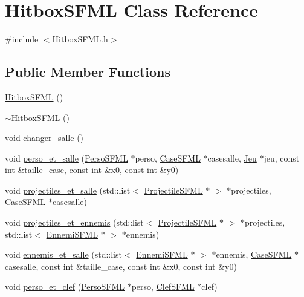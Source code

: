 \hypertarget{classHitboxSFML}{}\section{Hitbox\+S\+F\+ML Class Reference}
\label{classHitboxSFML}


{\ttfamily \#include $<$Hitbox\+S\+F\+M\+L.\+h$>$}

\subsection*{Public Member Functions}
\begin{DoxyCompactItemize}
\item 
\hyperlink{classHitboxSFML_aafccc1508ac80fe745810f2d9f4c10b1}{Hitbox\+S\+F\+ML} ()
\item 
\hyperlink{classHitboxSFML_a7db8de961747c56a000ccd1eb092805d}{$\sim$\+Hitbox\+S\+F\+ML} ()
\item 
void \hyperlink{classHitboxSFML_a8eed6ede26a0f46267570d7e8d96c199}{changer\+\_\+salle} ()
\item 
void \hyperlink{classHitboxSFML_a8ee11312dc168d63978e355af4c56af5}{perso\+\_\+et\+\_\+salle} (\hyperlink{classPersoSFML}{Perso\+S\+F\+ML} $\ast$perso, \hyperlink{classCaseSFML}{Case\+S\+F\+ML} $\ast$casesalle, \hyperlink{classJeu}{Jeu} $\ast$jeu, const int \&taille\+\_\+case, const int \&x0, const int \&y0)
\item 
void \hyperlink{classHitboxSFML_acb3e6f26e67ef2644103500e51909d42}{projectiles\+\_\+et\+\_\+salle} (std\+::list$<$ \hyperlink{classProjectileSFML}{Projectile\+S\+F\+ML} $\ast$ $>$ $\ast$projectiles, \hyperlink{classCaseSFML}{Case\+S\+F\+ML} $\ast$casesalle)
\item 
void \hyperlink{classHitboxSFML_a2fd60880489e78abd5195c17681a1832}{projectiles\+\_\+et\+\_\+ennemis} (std\+::list$<$ \hyperlink{classProjectileSFML}{Projectile\+S\+F\+ML} $\ast$ $>$ $\ast$projectiles, std\+::list$<$ \hyperlink{classEnnemiSFML}{Ennemi\+S\+F\+ML} $\ast$ $>$ $\ast$ennemis)
\item 
void \hyperlink{classHitboxSFML_a74a01b2e9be2b80826e41e9501df9628}{ennemis\+\_\+et\+\_\+salle} (std\+::list$<$ \hyperlink{classEnnemiSFML}{Ennemi\+S\+F\+ML} $\ast$ $>$ $\ast$ennemis, \hyperlink{classCaseSFML}{Case\+S\+F\+ML} $\ast$casesalle, const int \&taille\+\_\+case, const int \&x0, const int \&y0)
\item 
void \hyperlink{classHitboxSFML_a0a220e858ed3936822f7d5dccd0ab0f6}{perso\+\_\+et\+\_\+clef} (\hyperlink{classPersoSFML}{Perso\+S\+F\+ML} $\ast$perso, \hyperlink{classClefSFML}{Clef\+S\+F\+ML} $\ast$clef)
\end{DoxyCompactItemize}


